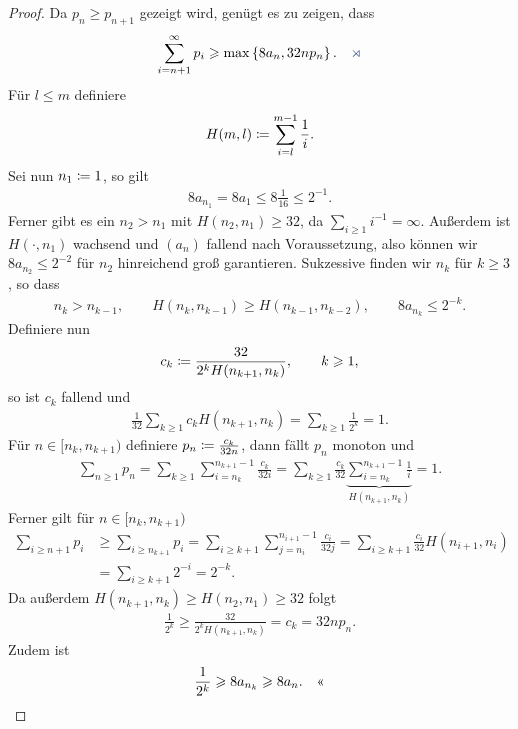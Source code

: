 \begin{proof}
Da $p_n\ge p_{n+1}$ gezeigt wird, genügt es zu zeigen, dass
\begin{align*}
\sum_{i=n+1}^\infty p_i \ge \max\setd{8a_n,32n p_{n}}.\fishhere
\end{align*}
Für $l\le m$ definiere
\begin{align*}
H(m,l) \defl \sum_{i=l}^{m-1} \frac{1}{i}.
\end{align*}
Sei nun $n_1\defl 1$, so gilt
\begin{align*}
8a_{n_1} = 8a_1 \le 8\frac{1}{16}\le 2^{-1}. 
\end{align*}
Ferner gibt es ein $n_2>n_1$ mit $H(n_2,n_1) \ge 32$, da $\sum_{i\ge 1} i^{-1}
= \infty$. Außerdem ist $H(\cdot,n_1)$ wachsend und $(a_n)$ fallend nach
Voraussetzung, also können wir $8a_{n_2}\le 2^{-2}$ für $n_2$ hinreichend groß
garantieren. Sukzessive finden wir $n_k$ für $k\ge 3$, so dass
\begin{align*}
n_k > n_{k-1},\qquad H(n_k,n_{k-1}) \ge H(n_{k-1},n_{k-2}),\qquad
8a_{n_k} \le 2^{-k}.
\end{align*}
Definiere nun
\begin{align*}
c_k \defl \frac{32}{2^k H(n_{k+1},n_k)},\qquad k\ge 1,
\end{align*}
so ist $c_k$ fallend und
\begin{align*}
\frac{1}{32}\sum_{k\ge 1} c_k H(n_{k+1},n_k) = \sum_{k\ge 1}\frac{1}{2^k} = 1.
\end{align*}
Für $n\in [n_k,n_{k+1})$ definiere $p_n \defl \frac{c_k}{32 n}$, dann fällt $p_n$
monoton und
\begin{align*}
\sum_{n\ge 1} p_n = \sum_{k\ge 1} \sum_{i=n_k}^{n_{k+1}-1} \frac{c_k}{32 i} = 
\sum_{k\ge 1} \frac{c_k}{32}
\underbrace{\sum_{i=n_k}^{n_{k+1}-1} \frac{1}{i}}_{H(n_{k+1},n_k)} = 1.
\end{align*}
Ferner gilt für $n\in[n_k,n_{k+1})$
\begin{align*}
\sum_{i\ge n+1} p_i &\ge \sum_{i\ge n_{k+1}} p_i
= \sum_{i\ge k+1}\sum_{j=n_i}^{n_{i+1}-1} \frac{c_i}{32 j}
= \sum_{i\ge k+1} \frac{c_i}{32} H(n_{i+1},n_i)\\
&= \sum_{i\ge k+1} 2^{-i} = 2^{-k}.
\end{align*}
Da außerdem $H(n_{k+1},n_k) \ge H(n_2,n_1) \ge 32$ folgt
\begin{align*}
\frac{1}{2^k} \ge \frac{32}{2^k H(n_{k+1},n_k)} = c_k = 32 np_n.
\end{align*}
Zudem ist
\begin{align*}
\frac{1}{2^k} \ge 8a_{n_k} \ge 8a_n.\qedhere
\end{align*}
\end{proof}

